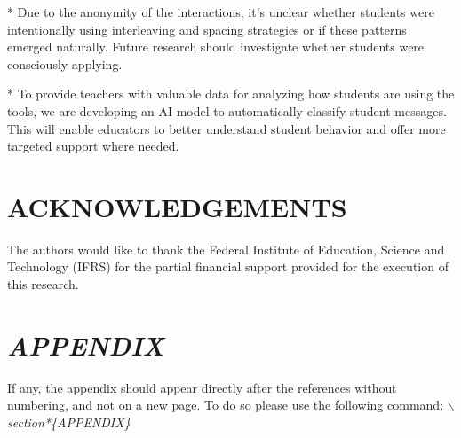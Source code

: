 \documentclass[a4paper,twoside]{article}
\begin{document}
* Due to the anonymity of the interactions, it's unclear whether
students were intentionally using interleaving and spacing strategies or if
these patterns emerged naturally. Future research should investigate whether
students were consciously applying.

* To provide teachers with valuable data for analyzing how students are using
the tools, we are developing an AI model to automatically classify student
messages. This will enable educators to better understand student behavior and
offer more targeted support where needed.

\section*{ACKNOWLEDGEMENTS}

The authors would like to thank the Federal Institute of Education, Science and
Technology (IFRS) for the partial financial support provided for the execution
of this research.


{\small
}

\section*{\uppercase{\textit{Appendix}}}

If any, the appendix should appear directly after the
references without numbering, and not on a new page. To do so please use the
following command: \textit{$\backslash$section*\{APPENDIX\}}
\end{document}
